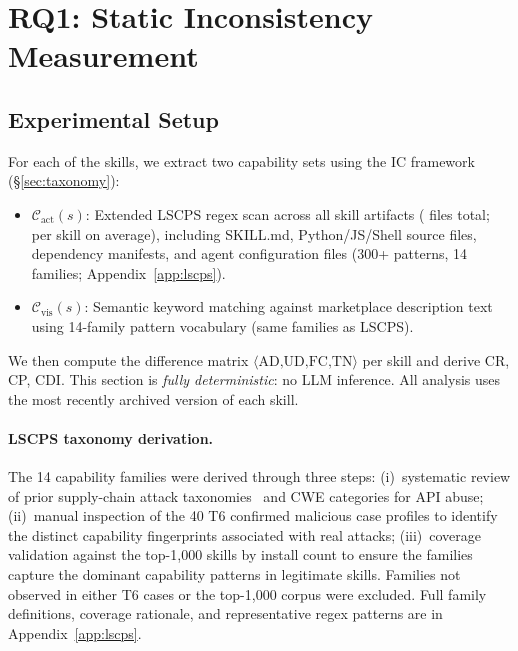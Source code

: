 
\section{RQ1: Static Inconsistency Measurement}
\label{sec:static}

\subsection{Experimental Setup}

For each of the \NskillsDMR{} \clawhub{} skills,
we extract two capability sets using the IC framework (\S\ref{sec:taxonomy}):
\begin{itemize}[topsep=2pt,itemsep=1pt]
\item $\mathcal{C}_{\text{act}}(s)$: Extended LSCPS regex scan across all skill artifacts
  (\ResultFilesRead{} files total; \ResultAvgFiles{} per skill on average),
  including SKILL.md, Python/JS/Shell source files, dependency manifests,
  and agent configuration files (300+ patterns, 14 families; Appendix~\ref{app:lscps}).
\item $\mathcal{C}_{\text{vis}}(s)$: Semantic keyword matching against marketplace
  description text using 14-family pattern vocabulary (same families as LSCPS).
\end{itemize}
We then compute the difference matrix $\langle\text{AD,UD,FC,TN}\rangle$ per skill
and derive CR, CP, CDI.
This section is \emph{fully deterministic}: no LLM inference.
All analysis uses the most recently archived version of each skill.

\paragraph{LSCPS taxonomy derivation.}
The 14 capability families were derived through three steps:
(i)~systematic review of prior supply-chain attack taxonomies~\cite{ohm2020backstabber,ladisa2023taxonomy}
and CWE categories for API abuse;
(ii)~manual inspection of the 40 T6 confirmed malicious case profiles to identify
the distinct capability fingerprints associated with real attacks;
(iii)~coverage validation against the top-1,000 \clawhub{} skills by install count
to ensure the families capture the dominant capability patterns in legitimate skills.
Families not observed in either T6 cases or the top-1,000 corpus were excluded.
Full family definitions, coverage rationale, and representative regex patterns
are in Appendix~\ref{app:lscps}.

